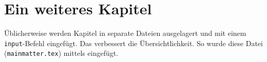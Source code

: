\section{Ein weiteres Kapitel}

Üblicherweise werden Kapitel in separate Dateien ausgelagert und mit einem \lstinline{input}-Befehl eingefügt. Das verbessert die Übersichtlichkeit. So wurde diese Datei (\lstinline{mainmatter.tex}) mittels \lstinline!! eingefügt.

